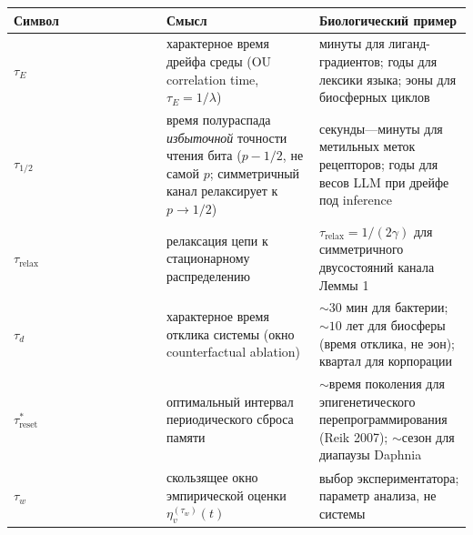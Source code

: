\documentclass[pdflatex,sn-mathphys-ay]{sn-jnl}
\begin{document}
\begin{center}\small
\begin{tabular}{@{} >{\raggedright\arraybackslash}p{0.3333\linewidth} >{\raggedright\arraybackslash}p{0.3333\linewidth} >{\raggedright\arraybackslash}p{0.3333\linewidth}@{}}
\toprule

\begin{minipage}[b]{\linewidth}\raggedright

Символ

\end{minipage} & \begin{minipage}[b]{\linewidth}\raggedright

Смысл

\end{minipage} & \begin{minipage}[b]{\linewidth}\raggedright

Биологический пример

\end{minipage} \\

\midrule

\(\tau_E\) & характерное время дрейфа среды (OU correlation time, \(\tau_E = 1/\lambda\)) & минуты для лиганд-градиентов; годы для лексики языка; эоны для биосферных циклов \\

\(\tau_{1/2}\) & время полураспада \emph{избыточной} точности чтения бита (\(p - 1/2\), не самой \(p\); симметричный канал релаксирует к \(p \to 1/2\)) & секунды---минуты для метильных меток рецепторов; годы для весов LLM при дрейфе под inference \\

\(\tau_{\text{relax}}\) & релаксация цепи к стационарному распределению & \(\tau_{\text{relax}} = 1/(2\gamma)\) для симметричного двусостояний канала Леммы 1 \\

\(\tau_d\) & характерное время отклика системы (окно counterfactual ablation) & \(\sim 30\) мин для бактерии; \(\sim 10\) лет для биосферы (время отклика, не эон); квартал для корпорации \\

\(\tau_{\text{reset}}^*\) & оптимальный интервал периодического сброса памяти & \(\sim\)время поколения для эпигенетического перепрограммирования (Reik 2007); \(\sim\)сезон для диапаузы Daphnia \\

\(\tau_w\) & скользящее окно эмпирической оценки \(\eta_v^{(\tau_w)}(t)\) & выбор экспериментатора; параметр анализа, не системы \\

\bottomrule
\end{tabular}
\end{center}
\end{document}
